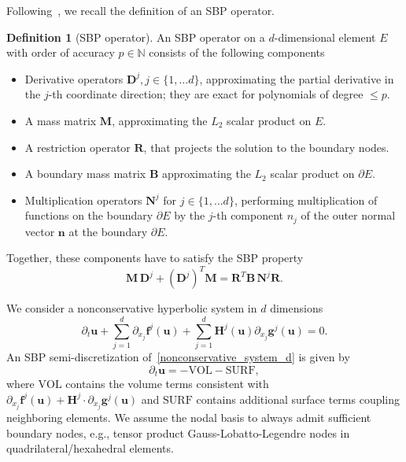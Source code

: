 \documentclass[]{scrartcl}
\newcommand{\mtx}[1]{\boldsymbol{#1}}
\renewcommand{\vec}[1]{\boldsymbol{#1}}
\theoremstyle{definition}
\newtheorem{definition}[theorem]{Definition}
\begin{document}
Following~\cite{Hicken2016_SBP,Ranocha2018}, we recall the definition of an SBP operator.
\begin{definition}[SBP operator]
    An SBP operator on a $d$-dimensional element $E$ with order of accuracy $p \in \mathbb{N}$ consists of the following components
    \begin{itemize}
        \item Derivative operators $\mtx{D}^j, j \in \{1, \dots d \}$, approximating the partial derivative in the $j$-th coordinate direction; they are exact for polynomials of degree $\leq p$.
        \item A mass matrix $\mtx{M}$, approximating the $L_2$ scalar product on $E$.
        \item A restriction operator $\mtx{R}$, that projects the solution to the boundary nodes.
        \item A boundary mass matrix $\mtx{B}$ approximating the $L_2$ scalar product on $\partial E$.
        \item Multiplication operators $\mtx{N}^j$ for $j \in \{1, \dots d \}$, performing multiplication of functions on the boundary $\partial E$ by the $j$-th component $n_j$ of the outer normal vector $\vec{n}$ at the boundary $\partial E$.
    \end{itemize}
    Together, these components have to satisfy the SBP property
    \begin{equation}\label{sbp_property}
        \mtx{M} \, \mtx{D}^j + (\mtx{D}^j)^T \mtx{M} = \mtx{R}^T \mtx{B} \, \mtx{N}^j \mtx{R}.
    \end{equation}
\end{definition}

We consider a nonconservative hyperbolic system in $d$ dimensions
\begin{equation}
\partial_t \vec{u} + \sum_{j=1}^d \partial_{x_j} \vec{f}^j(\vec{u}) + \sum_{j=1}^d \mtx{H}^j (\vec{u}) \partial_{x_j} \vec{g}^j(\vec{u}) = 0.
\label{nonconservative_system_d}
\end{equation}
An SBP semi-discretization of~\eqref{nonconservative_system_d} is given by
\begin{equation}
    \partial_t \vec{u} = - \vec{\mathrm{VOL}} - \vec{\mathrm{SURF}},
    \label{semi_SBP}
\end{equation}
where $\vec{\mathrm{VOL}}$ contains the volume terms consistent with $\partial_{x_j} \vec{f}^j(\vec{u}) + \mtx{H}^j \cdot \partial_{x_j} \vec{g}^j(\vec{u})$ and $\vec{\mathrm{SURF}}$ contains additional surface terms coupling neighboring elements.
We assume the nodal basis to always admit sufficient boundary nodes, e.g., tensor product Gauss-Lobatto-Legendre nodes in quadrilateral/hexahedral elements.
\end{document}
